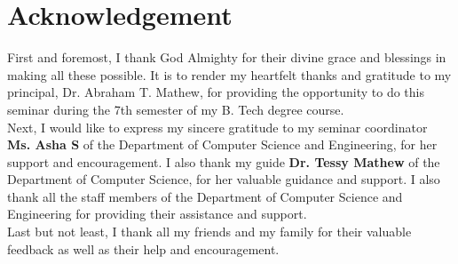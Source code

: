 \chapter*{\centering Acknowledgement}
\indent First and foremost, I thank God Almighty for their divine grace and blessings in making all these possible. It is to render my heartfelt thanks and gratitude to my principal, Dr. Abraham T. Mathew, for providing the opportunity to do this seminar during the 7th semester of my B. Tech degree course.
\\
\indent Next, I would like to express my sincere gratitude to my seminar coordinator \textbf{Ms. Asha S} of the Department of Computer Science and Engineering, for her support and encouragement. I also thank my guide \textbf{Dr. Tessy Mathew} of the Department of Computer Science, for her valuable guidance and support. I also thank all the staff members of the Department of Computer Science and Engineering for providing their assistance and support. 
\\
\indent Last but not least, I thank all my friends and my family for their valuable feedback as well as their help and encouragement.